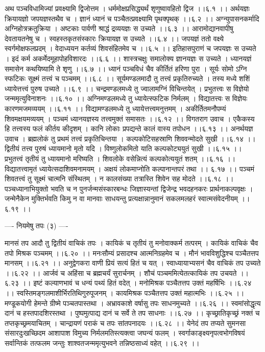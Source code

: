 \documentclass[11pt]{book}
\begin{document}
\begin{landscape}
अथ पञ्चविधामिज्यां प्रवक्ष्यामि द्विजोत्तम ।
धर्ममोक्षप्रसिद्ध्यर्थं शृणुष्वावहितो द्विज ।।६.१ ।।
अर्थयज्ञः क्रियायज्ञो जपयज्ञस्तथैव च ।
ज्ञानं ध्यानं च पञ्चैतत्प्रवक्ष्यामि पृथक्पृथक् ।।६.२ ।।
अग्न्युपासनकर्मादि अग्निहोत्रक्रतुक्रिया ।
अष्टकाः पार्वणी श्राद्धं द्रव्ययज्ञः स उच्यते ।।६.३ ।।
आरामोद्यानवापीषु देवतायतनेषु च ।
स्वहस्तकृतसंस्कारः क्रियायज्ञ स उच्यते ।।६.४ ।।
जपयज्ञं ततो वक्ष्ये स्वर्गमोक्षफलप्रदम् ।
वेदाध्ययन कर्तव्यं शिवसंहितमेव च ।।६.५ ।।
इतिहासपुराणं च जपयज्ञः स उच्यते ।
इदं कर्म अकर्मेदमूहापोहविशारदः ।।६.६ ।।
शास्त्रचक्षुः समालोक्य ज्ञानयज्ञः स उच्यते ।
ध्यानयज्ञं समासेन कथयिष्यामि ते शृणु ।।६.७ ।।
ध्यानं पञ्चविधं चैव कीर्तितं हरिणा पुरा ।
सूर्यः सोमो ऽग्नि स्फटिकः सूक्ष्मं तत्त्वं च पञ्चमम् ।।६.८ ।।
सूर्यमण्डलमादौ तु तत्त्वं प्रकृतिरुच्यते ।
तस्य मध्ये शशिं ध्यायेत्तत्त्वं पुरुष उच्यते ।।६.९ ।।
चन्द्रमण्डलमध्ये तु ज्वालामग्निं विचिन्तयेत् ।
प्रभुतत्त्वः स विज्ञेयो जन्ममृत्युविनाशनः ।।६.१० ।।
अग्निमण्डलमध्ये तु ध्यायेत्स्फटिक निर्मलम् ।
विद्यातत्त्वः स विज्ञेयः कारणमजमव्ययम् ।।६.११ ।।
विद्यामण्डलमध्ये तु ध्यायेत्तत्त्वमनुत्तमम् ।
अकीर्तितमनौपम्यं शिवमक्षयमव्ययम् ।
पञ्चमं ध्यानयज्ञस्य तत्त्वमुक्तं समासतः ।।६.१२ ।।
विगतराग उवाच ।
एकैकस्य हि तत्त्वस्य फलं कीर्तय कीदृशम् ।
कानि लोकाः प्रपद्यन्ते कालं वास्य तपोधन ।।६.१३ ।।
अनर्थयज्ञ उवाच ।
ब्रह्मलोकं तु प्रथमं तत्त्वं प्रकृतिचिन्तया ।
कल्पकोटिसहस्राणि शिववन्मोदते सुखी ।।६.१४ ।।
द्वितीयं तत्त्व पुरुषं ध्यायमानो मृतो यदि ।
विष्णुलोकमितो याति कल्पकोट्ययुतं सुखी ।।६.१५ ।।
प्रभुतत्त्वं तृतीयं तु ध्यायमानो मरिष्यति ।
शिवलोके वसेन्नित्यं कल्पकोत्ययुतं शतम् ।।६.१६ ।।
विद्यातत्त्वामृतं ध्यायेत्सदाशिवमनामयम् ।
अक्षयं लोकमाप्नोति कल्पानान्तपरं तथा ।। ६.१७ ।।
पञ्चमं शिवतत्त्वं तु सूक्ष्मं चात्मनि संस्थितम् ।
न कालसंख्या तत्रास्ति शिवेन सह मोदते ।।६.१८ ।।
पञ्चध्यानाभियुक्तो भवति च न पुनर्जन्मसंस्कारबन्धः
जिज्ञास्यन्तां द्विजेन्द्र भवदहनकरः प्रार्थनाकल्पवृक्षः ।
जन्मेनैकेन मुक्तिर्भवति किमु न वा मानवाः साधयन्तु
प्रत्यक्षान्नानुमानं सकलमलहरं स्वात्मसंवेदनीयम् ।।६.१९ ।।

---- नियमेषु तपः (३) ----

मानसं तप आदौ तु द्वितीयं वाचिकं तपः ।
कायिकं च तृतीयं तु मनोवाक्कर्म तत्परम् ।
कायिकं वाचिकं चैव तपो मिश्रक पञ्चमम् ।।६.२० ।।
मनःसौम्यं प्रसादश्च आत्मनिग्रहमेव च ।
मौनं भावविशुद्धिश्च पञ्चैतत्तप मानसम् ।।६.२१ ।।
अनुद्वेगकरा वाणी प्रियं सत्यं हितं च यत् ।
स्वाध्यायाभ्यसनं चैव वाचिकं तप उच्यते ।।६.२२ ।।
आर्जवं च अहिंसा च ब्रह्मचर्यं सुरार्चनम् ।
शौचं पञ्चममित्येतत्कायिकं तप उचयते ।।६.२३ ।।
इष्टं कल्याणभावं च धन्यं पथ्यं हितं वदेत् ।
मनोमिश्रक पञ्चैतत्तप उक्तं महर्षिभिः ।।६.२४ ।।
स्वस्तिमङ्गलमाशीर्भिरतिथिगुरुपूजनम् ।
कायमिश्रक पञ्चैतत्तप उक्तं महात्मभिः ।।६.२५ ।।
मण्डूकयोगी हेमन्ते ग्रीष्मे पञ्चतपास्तथा ।
अभ्रावकाशे वर्षासु तपः साधनमुच्यते ।।६.२६ ।।
स्वमांसोद्धृत्य दानं च हस्तपादशिरस्तथा ।
पुष्पमुत्पाद्य दानं च सर्वे ते तप साधनाः ।।६.२७ ।।
कृच्छ्रातिकृच्छ्रं नक्तं च तप्तकृच्छ्रमयाचितम् ।
चान्द्रायणं पराकं च तपः सांतपनादयः ।।६.२८ ।।
येनेदं तप तप्यते सुमनसा संसारदुःखच्छिदम
आशापाश विमुच्य निर्मलमतिस्त्यक्त्वा जघन्यं फलम् ।
स्वर्गाकाङ्क्ष्यनृपत्वभोगविषयं सर्वान्तिकं तत्फलम
जन्तुः शाश्वतजन्ममृत्युभवने तन्निष्ठसाध्यं वहेत् ।।६.२९ ।।


\end{landscape}
\end{document}
